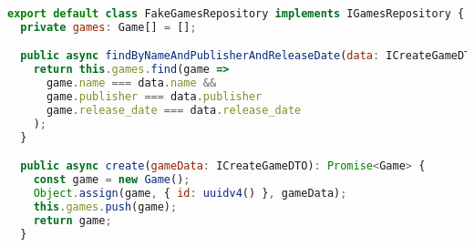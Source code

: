 \begin{lstlisting}[language=JavaScript, caption={Outra implementação do IGamesRepository},captionpos=b, label=alg:fakegamesrepository]
export default class FakeGamesRepository implements IGamesRepository {
  private games: Game[] = [];

  public async findByNameAndPublisherAndReleaseDate(data: ICreateGameDTO): Promise<Game | undefined> {
    return this.games.find(game => 
      game.name === data.name && 
      game.publisher === data.publisher
      game.release_date === data.release_date
    );
  }

  public async create(gameData: ICreateGameDTO): Promise<Game> {
    const game = new Game();
    Object.assign(game, { id: uuidv4() }, gameData);
    this.games.push(game);
    return game;
  }
\end{lstlisting}